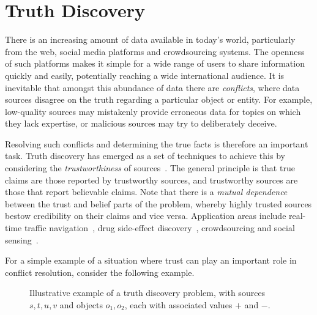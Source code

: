 \chapter{Truth Discovery}
\label{chapter_td}

There is an increasing amount of data available in today's world, particularly
from the web, social media platforms and crowdsourcing systems. The openness of
such platforms makes it simple for a wide range of users to share information
quickly and easily, potentially reaching a wide international audience. It is
inevitable that amongst this abundance of data there are \emph{conflicts},
where data sources disagree on the truth regarding a particular object or
entity. For example, low-quality sources may mistakenly provide erroneous data
for topics on which they lack expertise, or malicious sources may try to
deliberately deceive.

Resolving such conflicts and determining the true facts is therefore an
important task. Truth discovery has emerged as a set of techniques to achieve
this by considering the \emph{trustworthiness} of
sources~\cite{li_survey_2016,gupta2011survey,berti2015veracity}. The general
principle is that true claims are those reported by trustworthy sources, and
trustworthy sources are those that report believable claims. Note that there is
a \emph{mutual dependence} between the trust and belief parts of the problem,
whereby highly trusted sources bestow credibility on their claims and vice
versa. Application areas include real-time traffic navigation~\cite{du2019},
drug side-effect discovery~\cite{ma2017}, crowdsourcing and social
sensing~\cite{zhang_robust_2016,wang_truth_2012,ma_faitcrowd_2015}.

For a simple example of a situation where trust can play an important role in
conflict resolution, consider the following example.

\begin{figure}
    \centering
    \caption{
        Illustrative example of a truth discovery problem, with sources
        $s, t, u, v$ and objects $o_1, o_2$, each with associated values $+$
        and $-$.
    }
    \label{td_new_fig_intro_example_with_values}
\end{figure}

